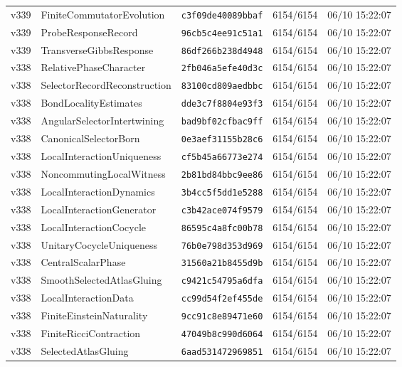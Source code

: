 \documentclass[11pt]{article}
\theoremstyle{definition}\newtheorem{deriv}{Derivação}
\begin{document}
{\begin{longtable}{@{}lllll@{}}
v339 & FiniteCommutatorEvolution & \texttt{c3f09de40089bbaf} & 6154/6154 & 06/10 15:22:07 \\
v339 & ProbeResponseRecord & \texttt{96cb5c4ee91c51a1} & 6154/6154 & 06/10 15:22:07 \\
v339 & TransverseGibbsResponse & \texttt{86df266b238d4948} & 6154/6154 & 06/10 15:22:07 \\
v338 & RelativePhaseCharacter & \texttt{2fb046a5efe40d3c} & 6154/6154 & 06/10 15:22:07 \\
v338 & SelectorRecordReconstruction & \texttt{83100cd809aedbbc} & 6154/6154 & 06/10 15:22:07 \\
v338 & BondLocalityEstimates & \texttt{dde3c7f8804e93f3} & 6154/6154 & 06/10 15:22:07 \\
v338 & AngularSelectorIntertwining & \texttt{bad9bf02cfbac9ff} & 6154/6154 & 06/10 15:22:07 \\
v338 & CanonicalSelectorBorn & \texttt{0e3aef31155b28c6} & 6154/6154 & 06/10 15:22:07 \\
v338 & LocalInteractionUniqueness & \texttt{cf5b45a66773e274} & 6154/6154 & 06/10 15:22:07 \\
v338 & NoncommutingLocalWitness & \texttt{2b81bd84bbc9ee86} & 6154/6154 & 06/10 15:22:07 \\
v338 & LocalInteractionDynamics & \texttt{3b4cc5f5dd1e5288} & 6154/6154 & 06/10 15:22:07 \\
v338 & LocalInteractionGenerator & \texttt{c3b42ace074f9579} & 6154/6154 & 06/10 15:22:07 \\
v338 & LocalInteractionCocycle & \texttt{86595c4a8fc00b78} & 6154/6154 & 06/10 15:22:07 \\
v338 & UnitaryCocycleUniqueness & \texttt{76b0e798d353d969} & 6154/6154 & 06/10 15:22:07 \\
v338 & CentralScalarPhase & \texttt{31560a21b8455d9b} & 6154/6154 & 06/10 15:22:07 \\
v338 & SmoothSelectedAtlasGluing & \texttt{c9421c54795a6dfa} & 6154/6154 & 06/10 15:22:07 \\
v338 & LocalInteractionData & \texttt{cc99d54f2ef455de} & 6154/6154 & 06/10 15:22:07 \\
v338 & FiniteEinsteinNaturality & \texttt{9cc91c8e89471e60} & 6154/6154 & 06/10 15:22:07 \\
v338 & FiniteRicciContraction & \texttt{47049b8c990d6064} & 6154/6154 & 06/10 15:22:07 \\
v338 & SelectedAtlasGluing & \texttt{6aad531472969851} & 6154/6154 & 06/10 15:22:07 \\

\end{longtable}}
\end{document}
